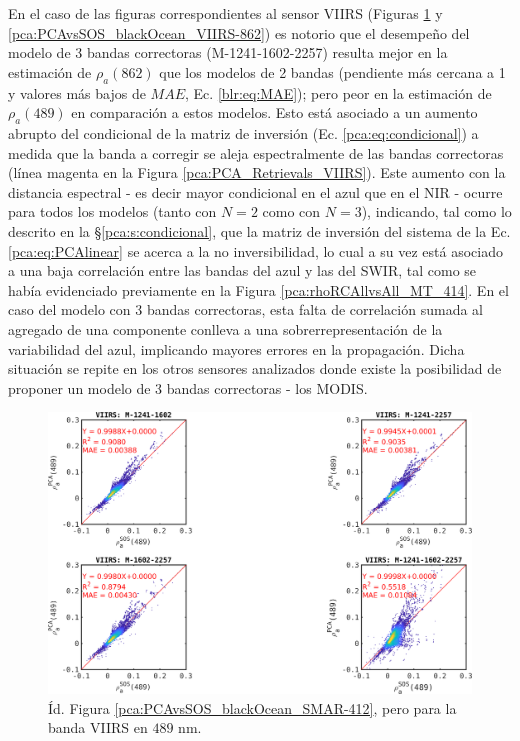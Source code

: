         En el caso de las figuras correspondientes al sensor VIIRS (Figuras \ref{pca:PCAvsSOS_blackOcean_VIIRS-489} y \ref{pca:PCAvsSOS_blackOcean_VIIRS-862}) es notorio que el desempeño del modelo de 3 bandas correctoras (M-1241-1602-2257) resulta mejor en la estimación de $\rho_{a}(862)$ que los modelos de 2 bandas (pendiente más cercana a 1 y valores más bajos de $MAE$, Ec. \ref{blr:eq:MAE}); pero peor en la estimación de $\rho_{a}(489)$ en comparación a estos modelos. Esto está asociado a un aumento abrupto del condicional de la matriz de inversión (Ec. \ref{pca:eq:condicional}) a medida que la banda a corregir se aleja espectralmente de las bandas correctoras  (línea magenta en la Figura \ref{pca:PCA_Retrievals_VIIRS}). Este aumento con la distancia espectral - es decir mayor condicional en el azul que en el NIR - ocurre para todos los modelos (tanto con $N=2$ como con $N=3$), indicando, tal como lo descrito en la \S \ref{pca:s:condicional}, que la matriz de inversión del sistema de la Ec. \ref{pca:eq:PCAlinear} se acerca a la no inversibilidad, lo cual a su vez está asociado a una baja correlación entre las bandas del azul y las del SWIR, tal como se había evidenciado previamente en la Figura \ref{pca:rhoRCAllvsAll_MT_414}. En el caso del modelo con 3 bandas correctoras, esta falta de correlación sumada al agregado de una componente conlleva a una sobrerrepresentación de la variabilidad del azul, implicando mayores errores en la propagación. Dicha situación se repite en los otros sensores analizados donde existe la posibilidad de proponer un modelo de 3 bandas correctoras - los MODIS.

        \begin{figure}
        \centering
        \includegraphics[width=\textwidth]{pca/figures/PCAvsSOS_blackOcean_VIIRS-489.png}
        \caption[Reflectancia de aerosoles estimada por PCA vs. simulada para la banda de VIIRS en $489$ nm.]{Íd. Figura \ref{pca:PCAvsSOS_blackOcean_SMAR-412}, pero para la banda VIIRS en $489$ nm.}
        \label{pca:PCAvsSOS_blackOcean_VIIRS-489}
        \end{figure}


